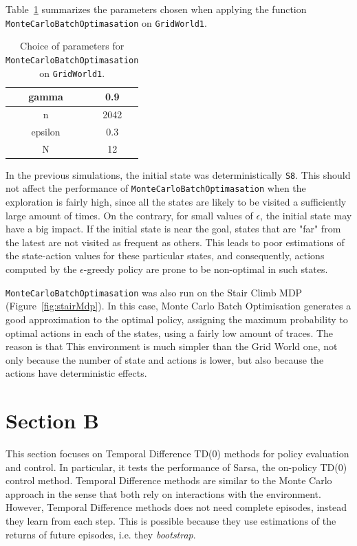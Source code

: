 \documentclass[10pt]{article}   	%
\begin{document}
Table~\ref{tab:parameters} summarizes the parameters chosen when applying the function \texttt{MonteCarloBatchOptimasation} on \texttt{GridWorld1}.

\begin{table}[!h] 
	\begin{center}
		\begin{tabular}{ | c c  | }
		\hline
		gamma & 0.9 \\ \hline
		n & 2042\\ \hline
		epsilon & 0.3 \\ \hline
		N &  12\\ \hline
		\end{tabular}
		\caption{Choice of parameters for \texttt{MonteCarloBatchOptimasation} on \texttt{GridWorld1}.\label{tab:parameters}}
		
	\end{center}
\end{table}

In the previous simulations, the initial state was deterministically \texttt{S8}. This should not affect the performance of \texttt{MonteCarloBatchOptimasation} when the exploration is fairly high, since all the states are likely to be visited a sufficiently large amount of times. On the contrary, for small values of $\epsilon$, the initial state may have a big impact. If the initial state is near the goal, states that are "far" from the latest are not visited as frequent as others. This leads to poor estimations of the state-action values for these particular states, and consequently, actions computed by the $\epsilon$-greedy policy are prone to be non-optimal in such states. 

\texttt{MonteCarloBatchOptimasation} was also run on the Stair Climb MDP (Figure~\ref{fig:stairMdp}). In this case, Monte Carlo Batch Optimisation generates a good approximation to the optimal policy, assigning the maximum probability to optimal actions in each of the states, using a fairly low amount of traces. The reason is that This environment is much simpler than the Grid World one, not only because the number of state and actions is lower, but also because the actions have deterministic effects.


\section*{Section B}

This section focuses on Temporal Difference TD(0) methods for policy evaluation and control. In particular, it tests the performance of Sarsa, the on-policy TD(0) control method. Temporal Difference methods are similar to the  Monte Carlo approach in the sense that both rely on interactions with the environment. However, Temporal Difference methods does not need complete episodes, instead they learn from each step. This is possible because they use estimations of the returns of future episodes, i.e. they \textit{bootstrap}.\cite{sutton}
\end{document}
